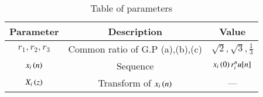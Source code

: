 \begin{table}[ht]
\renewcommand\thetable{1}
\begin{tabular}{|c|c|c|}
    \hline 
    \textbf{Parameter}&\textbf{Description} &\textbf{Value}\\
    \hline 
    $r_1, r_2, r_3$ & Common ratio of G.P (a),(b),(c) & $\sqrt{2}, \sqrt{3}, \frac{1}{3}$ \\
    \hline 
    $x_i\left(n\right)$ & Sequence & $x_i\left(0\right)r_i^nu[n]$ \\
    \hline 
    $X_i\left(z\right)$ & Transform of $x_i\left(n\right)$ & --- \\
    \hline
\end{tabular}

\caption{Table of parameters}
\label{Table:1}
\end{table}